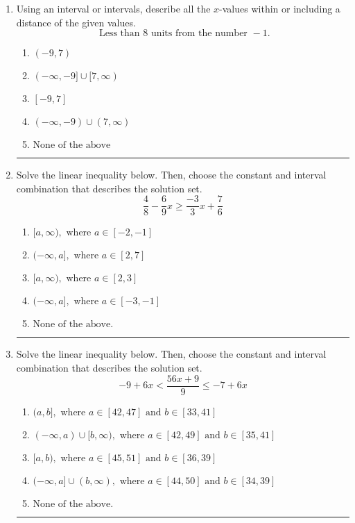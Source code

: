 \documentclass[14pt]{extbook}
\newcommand{\litem}[1]{\item#1\hspace*{-1cm}\rule{\textwidth}{0.4pt}}
\begin{document}
\begin{enumerate}
{\begin{enumerate}[label=\Alph*.]
\end{enumerate} }
\litem{
Using an interval or intervals, describe all the $x$-values within or including a distance of the given values.\[ \text{ Less than } 8 \text{ units from the number } -1. \]\begin{enumerate}[label=\Alph*.]
\item \( (-9, 7) \)
\item \( (-\infty, -9] \cup [7, \infty) \)
\item \( [-9, 7] \)
\item \( (-\infty, -9) \cup (7, \infty) \)
\item \( \text{None of the above} \)

\end{enumerate} }
\litem{
Solve the linear inequality below. Then, choose the constant and interval combination that describes the solution set.\[ \frac{4}{8} - \frac{6}{9} x \geq \frac{-3}{3} x + \frac{7}{6} \]\begin{enumerate}[label=\Alph*.]
\item \( [a, \infty), \text{ where } a \in [-2, -1] \)
\item \( (-\infty, a], \text{ where } a \in [2, 7] \)
\item \( [a, \infty), \text{ where } a \in [2, 3] \)
\item \( (-\infty, a], \text{ where } a \in [-3, -1] \)
\item \( \text{None of the above}. \)

\end{enumerate} }
\litem{
Solve the linear inequality below. Then, choose the constant and interval combination that describes the solution set.\[ -9 + 6 x < \frac{56 x + 9}{9} \leq -7 + 6 x \]\begin{enumerate}[label=\Alph*.]
\item \( (a, b], \text{ where } a \in [42, 47] \text{ and } b \in [33, 41] \)
\item \( (-\infty, a) \cup [b, \infty), \text{ where } a \in [42, 49] \text{ and } b \in [35, 41] \)
\item \( [a, b), \text{ where } a \in [45, 51] \text{ and } b \in [36, 39] \)
\item \( (-\infty, a] \cup (b, \infty), \text{ where } a \in [44, 50] \text{ and } b \in [34, 39] \)
\item \( \text{None of the above.} \)


\end{enumerate}}
\end{enumerate}
\end{document}
